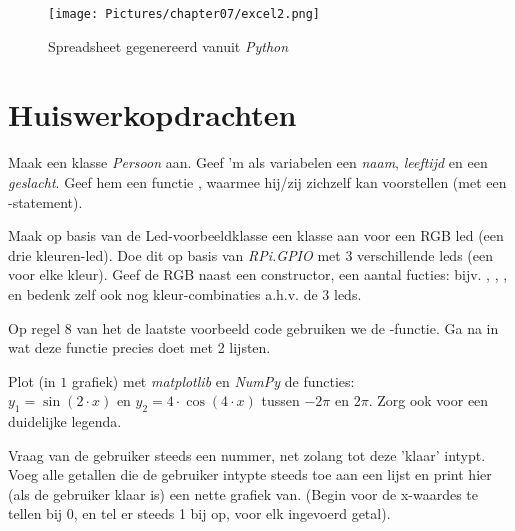\begin{figure}[h!]
\centering\texttt{[image: Pictures/chapter07/excel2.png]}
\caption{Spreadsheet gegenereerd vanuit \textit{Python}}
\label{fig:excel1} %
\end{figure}

\newpage

\section{Huiswerkopdrachten}
\begin{exercise}
Maak een klasse \textit{Persoon} aan. Geef 'm als variabelen een \textit{naam}, \textit{leeftijd} en een \textit{geslacht}. Geef hem een functie , waarmee hij/zij zichzelf kan voorstellen (met een -statement). 
\end{exercise}

\begin{exercise}
Maak op basis van de Led-voorbeeldklasse een klasse aan voor een RGB led (een drie kleuren-led). Doe dit op basis van \textit{RPi.GPIO} met $3$ verschillende leds (een voor elke kleur). Geef de RGB naast een constructor, een aantal fucties: bijv. , , ,  en bedenk zelf ook nog kleur-combinaties a.h.v. de $3$ leds.
\end{exercise}

\begin{exercise}
Op regel $8$ van het de laatste voorbeeld code gebruiken we de -functie. Ga na in wat deze functie precies doet met 2 lijsten. 
\end{exercise}

\begin{exercise}
Plot (in $1$ grafiek) met \textit{matplotlib} en \textit{NumPy} de functies: \\
$y_{1}=\sin(2\cdot x)$ en $y_{2}=4\cdot\cos(4\cdot x)$ tussen $-2\pi$ en $2\pi$. Zorg ook voor een duidelijke legenda.
\end{exercise}

\begin{exercise}
\label{exc7:exc2}
Vraag van de gebruiker steeds een nummer, net zolang tot deze 'klaar' intypt. \\
Voeg alle getallen die de gebruiker intypte steeds toe aan een lijst en print hier (als de gebruiker klaar is) een nette grafiek van. (Begin voor de x-waardes te tellen bij $0$, en tel er steeds 1 bij op, voor elk ingevoerd getal).
\end{exercise}

